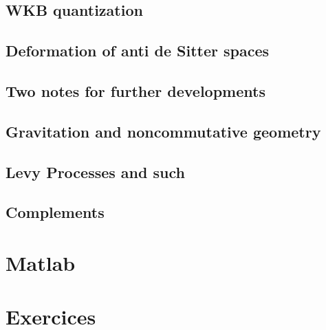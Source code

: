 \documentclass[french,a4paper]{book}
\begin{document}
\chapter{WKB quantization}


\chapter{Deformation of anti de Sitter spaces}   \label{ChDefoBH}


\chapter{Two notes for further developments}        \label{ChapNoteDev}



\chapter{Gravitation and noncommutative geometry}


\chapter{Levy Processes and such}


\chapter{Complements}









\emptyInputPath
{}

\part{Matlab}




\emptyInputPath
{}
\part{Exercices}





\end{document}
